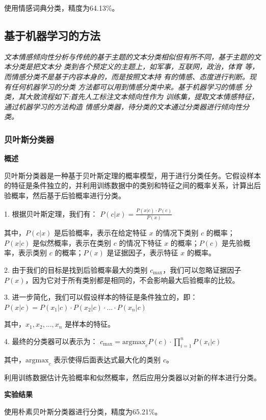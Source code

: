 \documentclass[hyperref,a4paper,UTF8]{ctexart}
\begin{document}
使用情感词典分类，精度为64.13\%。

\subsection{基于机器学习的方法}
\textit{文本情感倾向性分析与传统的基于主题的文本分类相似但有所不同，基于主题的文本分类是把文本分 类到各个预定义的主题上，如军事，互联网，政治，体育 等，而情感分类不是基于内容本身的，而是按照文本持 有的情感、态度进行判断。现有任何机器学习的分类 方法都可以用到情感分类中来。基于机器学习的情感 分类，其大致流程如下:首先人工标注文本倾向性作为 训练集，提取文本情感特征，通过机器学习的方法构造 情感分类器，待分类的文本通过分类器进行倾向性分类。}\cite{DBLP:journals/widm/ZhangWL18}


\subsubsection{贝叶斯分类器}

\textbf{概述}

贝叶斯分类器是一种基于贝叶斯定理的概率模型，用于进行分类任务。它假设样本的特征是条件独立的，并利用训练数据中的类别和特征之间的概率关系，计算出后验概率，然后基于后验概率进行分类。
\cite{DBLP:journals/corr/abs-1801-07883}


1. 根据贝叶斯定理，我们有：
   $ P(c|x) = \frac{P(x|c) \cdot P(c)}{P(x)} $

   其中，$ P(c|x) $ 是后验概率，表示在给定特征 $ x $ 的情况下类别 $ c $ 的概率；$ P(x|c) $ 是似然概率，表示在类别 $ c $ 的情况下特征 $ x $ 的概率；$ P(c) $ 是先验概率，表示类别 $ c $ 的概率；$ P(x) $ 是证据因子，表示特征 $ x $ 的概率。

2. 由于我们的目标是找到后验概率最大的类别 $ c_{\text{max}} $，我们可以忽略证据因子 $ P(x) $，因为它对于所有类别都是相同的，不会影响最大后验概率的比较。

3. 进一步简化，我们可以假设样本的特征是条件独立的，即：
   $ P(x|c) = P(x_1|c) \cdot P(x_2|c) \cdot ... \cdot P(x_n|c) $

   其中，$ x_1, x_2, ..., x_n $ 是样本的特征。

4. 最终的分类器可以表示为：
   $ c_{\text{max}} = \text{argmax}_c P(c) \cdot \prod_{i=1}^n P(x_i|c) $

   其中，$ \text{argmax}_c $ 表示使得后面表达式最大化的类别 $ c $。

利用训练数据估计先验概率和似然概率，然后应用分类器以对新的样本进行分类。


\textbf{实验结果}


使用朴素贝叶斯分类器进行分类，精度为65.21\%。
\end{document}
